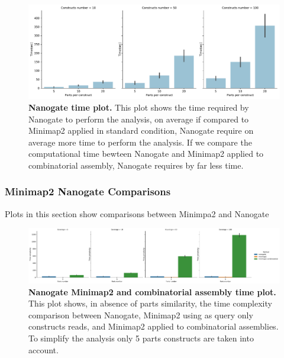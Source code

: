 \documentclass[11pt, a4paper]{article}
\begin{document}
\begin{figure}[ht]
    \begin{center}
    \includegraphics[width=1.35\textwidth]{../results/images_notebook/v_400/nanogate_sim_00_time_plot.pdf}
    \end{center}
    \caption{{\bf  Nanogate time plot.} This plot shows the time required by Nanogate to perform the analysis, on average if compared to Minimap2 applied in standard condition, Nanogate require on average more time to perform the analysis. If we compare the computational time bewteen Nanogate and Minimap2 applied to combinatorial assembly, Nanogate requires by far less time.   }
   \label{fig:v_400_nanogate_time_sim_00}
\end{figure}

\clearpage
\subsubsection{Minimap2 Nanogate Comparisons}
Plots in this section show comparisons between Minimpa2 and Nanogate

\begin{figure}[ht]
    \begin{center}
    \includegraphics[width=1.35\textwidth]{../results/images_notebook/v_400/sim_00_5_parts_time_comparison.pdf}
    \end{center}
    \caption{{\bf Nanogate Minimap2 and combinatorial assembly time plot.} This plot shows, in absence of parts similarity, the time complexity comparison between Nanogate, Minimap2 using as query only constructs reads, and Minimap2 applied to combinatorial assemblies. To simplify the analysis only 5 parts constructs are taken into account.}
   \label{fig:v_400_sim_00_5_parts_time_comparison}
\end{figure}
 
\end{document}
